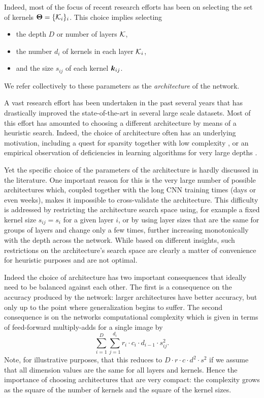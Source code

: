 Indeed, most of the focus of recent research efforts has been on selecting the set of kernels $\bm{\Theta} = \{\mathcal{K}_i\}_i$. This choice implies selecting
\begin{itemize}
\item the depth $D$ or number of layers $\mathcal{K}$,
\item the number $d_i$ of kernels in each layer $\mathcal{K}_i$,
\item and the size $s_{ij}$ of each kernel $\bm{k}_{ij}$.
\end{itemize}
We refer collectively to these parameters as the \emph{architecture} of the network.

A vast research effort has been undertaken in the past several years that has drastically improved the state-of-the-art in several large scale datasets. Most of this effort has amounted to choosing a different architecture by means of a heuristic search. Indeed, the choice of architecture often has an underlying motivation, including a quest for sparsity together with low complexity \cite{inception}, or an empirical observation of deficiencies in learning algorithms for very large depths \cite{resnet}. 

Yet the specific choice of the parameters of the architecture is hardly discussed in the literature. One important reason for this is the very large number of possible architectures which, coupled together with the long CNN training times (days or even weeks), makes it impossible to cross-validate the architecture. This difficulty is addressed by restricting the architecture search space using, for example a fixed kernel size $s_{ij}=s_i$ for a given layer $i$, or by using layer sizes that are the same for groups of layers and change only a few times, further increasing monotonically with the depth across the network. While based on different insights, such restrictions on the architecture's search space are clearly a matter of convenience for heuristic purposes and are not optimal.

Indeed the choice of architecture has two important consequences that ideally need to be balanced against each other. The first is a consequence on the accuracy produced by the network: larger architectures have better accuracy, but only up to the point where generalization begins to suffer. The second consequence is on the networks computational complexity which is given in terms of feed-forward multiply-adds for a single image by
\begin{equation} \label{eq:complexity}
\sum_{i=1}^D \sum_{j=1}^{d_i} r_i \cdot c_i \cdot d_{i-1} \cdot s_{ij}^2.
\end{equation}
Note, for illustrative purposes, that this reduces to $D \cdot r \cdot c \cdot d^2 \cdot s^2 $ if we assume that all dimension values are the same for all layers and kernels. Hence the importance of choosing architectures that are very compact: the complexity grows as the square of the number of kernels and the square of the kernel sizes. 

